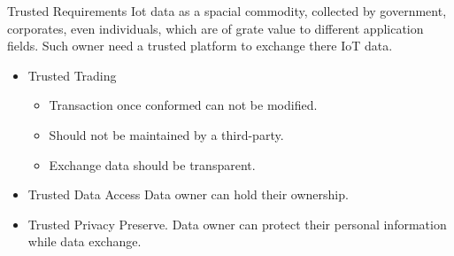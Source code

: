 \documentclass[10pt]{beamer}
\begin{document}
\begin{frame}{Trusted Requirements}
	Iot data as a spacial commodity, collected by government, corporates, even individuals, which are of grate value to different application fields. Such owner need a trusted platform to exchange there IoT data.

  \begin{itemize}[<+- | alert@+>]
     \item[] \begin{exampleblock}{Trusted Trading}
        \begin{itemize}
		  \item Transaction once conformed can not be modified.
		  \item Should not be maintained by a third-party.
		  \item Exchange data should be transparent.
 		\end{itemize}
      \end{exampleblock}
         \item[] \begin{exampleblock}{Trusted Data Access}
			 Data owner can hold their ownership.
      \end{exampleblock}
        \item[] \begin{exampleblock}{Trusted Privacy Preserve.}
        Data owner can protect their personal information while data exchange.
      \end{exampleblock}
  \end{itemize}
\end{frame}
\end{document}
